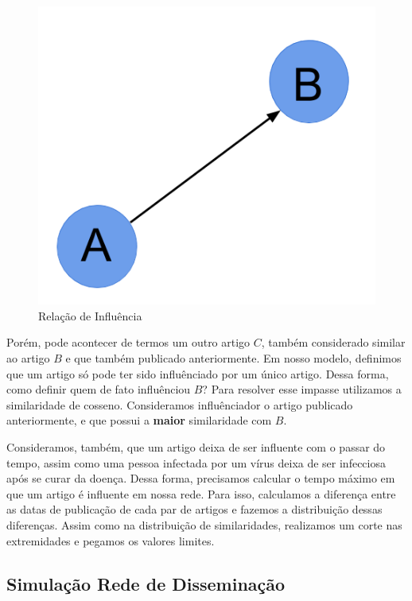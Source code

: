 \documentclass[a4paper,12pt]{article}
\begin{document}
\begin{description}
    \begin{figure}[h]
      \centering
      \includegraphics[scale=0.2]{./rede2.png}
      \caption{Relação de Influência}
    \end{figure}
    
    \pagebreak

    Porém, pode acontecer de termos um outro artigo $C$, também considerado similar ao artigo $B$ e que também publicado anteriormente. Em nosso modelo,
    definimos que um artigo só pode ter sido influênciado por um único artigo. Dessa forma, como definir quem de fato influênciou $B$? Para
    resolver esse impasse utilizamos a similaridade de cosseno. Consideramos influênciador o artigo publicado anteriormente, e que possui
    a \textbf{maior} similaridade com $B$.
    
    Consideramos, também, que um artigo deixa de ser influente com o passar do tempo, assim como uma pessoa infectada por um vírus deixa
    de ser infecciosa após se curar da doença. Dessa forma, precisamos calcular o tempo máximo em que um artigo é influente em nossa rede.
    Para isso, calculamos a diferença entre as datas de publicação de cada par de artigos e fazemos a distribuição dessas diferenças. Assim como
    na distribuição de similaridades, realizamos um corte nas extremidades e pegamos os valores limites.
 \end{description}
 

\subsection{Simulação Rede de Disseminação}
\end{document}
